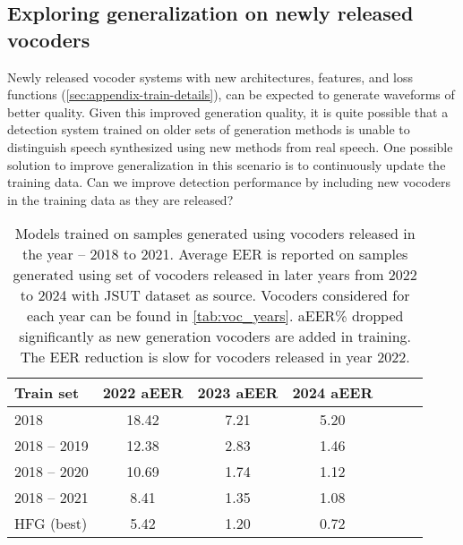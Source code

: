 \subsection{Exploring generalization on newly released vocoders}\label{sec:exp-3}

Newly released vocoder systems with new architectures, features, and loss functions (\autoref{sec:appendix-train-details}), can be expected to generate waveforms of better quality. Given this improved generation quality, it is quite possible that a detection system trained on older sets of generation methods is unable to distinguish speech synthesized using new methods from real speech. One possible solution to improve generalization in this scenario is to continuously update the training data. Can we improve detection performance by including new vocoders in the training data as they are released? 

\begin{table}[ht]
    \caption{Models trained on samples generated using vocoders released in the year -- 2018 to 2021. Average EER is reported on samples generated using set of vocoders released in later years from 2022 to 2024 with JSUT dataset as source. Vocoders considered for each year can be found in \autoref{tab:voc_years}. aEER\% dropped significantly as new generation vocoders are added in training. The EER reduction is slow for vocoders released in year 2022. }
    \label{tab:gen_voc}
\vskip 0.15in
\begin{center}
\begin{small}
\begin{sc}
    \begin{tabular}{lcccccc}
    \toprule
Train set  & 2022 aEER & 2023 aEER & 2024 aEER \\ 
    \midrule
    2018 & 18.42 & 7.21 & 5.20 \\ 
    \hline
    2018 -- 2019 & 12.38 & 2.83 & 1.46 \\ 
    \hline
    2018 -- 2020 & 10.69 & 1.74 & 1.12 \\
    \hline
    2018 -- 2021 & 8.41 & 1.35 & 1.08 \\ 
    \hline
    HFG (best) & 5.42 & 1.20 & 0.72 \\ 
         \bottomrule 
    \end{tabular}
\end{sc}
\end{small}
\end{center}
\vskip -0.1in
\end{table}


